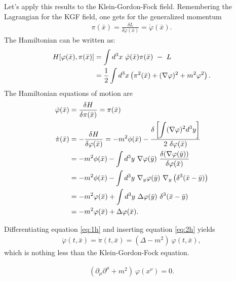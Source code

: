 Let's apply this results to the Klein-Gordon-Fock field. Remembering the Lagrangian for the KGF field, one gets for the generalized momentum
\begin{align}
\pi(\bar{x}) = \frac{\delta L}{\delta \dot{\varphi}(\bar{x})} = \dot{\varphi}(\bar{x}).
\end{align}
The Hamiltonian can be written as:
\begin{align}
H[\varphi(\bar{x}), \pi(\bar{x})] &= \int d^3 x \ \dot{\varphi}(\bar{x}) \pi(\bar{x}) \ - \ L \notag \\
&= \frac{1}{2} \int d^3 x \left( \pi^2(\bar{x}) + (\nabla \varphi)^2 + m^2 \varphi^2 \right).
\end{align}
The Hamiltonian equations of motion are
\begin{align}
\dot{\varphi}(\bar{x}) &= \frac{\delta H}{\delta \pi(\bar{x})} = \pi(\bar{x}) \label{eq:1h} \\
\dot{\pi}(\bar{x}) &= - \frac{\delta H}{\delta \varphi(\bar{x})} = - m^2 \phi(\bar{x}) - \frac{\delta \left[\displaystyle\int (\nabla \varphi)^2 d^3 y \right]}{2 \ \delta \varphi(\bar{x})} \notag \\
&= - m^2 \phi(\bar{x}) - \displaystyle\int d^3 y \ \nabla \varphi(\bar{y}) \ \frac{\delta (\nabla \varphi(\bar{y}))}{\delta \varphi(\bar{x})} \notag \\
&= - m^2 \phi(\bar{x}) - \displaystyle\int d^3 y \ \nabla_y \varphi(\bar{y}) \ \nabla_y \left( \delta^3(\bar{x}-\bar{y}) \right) \notag \\
&= - m^2 \varphi(\bar{x}) + \displaystyle\int d^3 y \ \Delta \varphi(\bar{y}) \ \delta^3(\bar{x}-\bar{y}) \notag \\
&= - m^2 \varphi(\bar{x}) + \Delta \varphi(\bar{x}). \label{eq:2h}
\end{align}

Differentiating equation \eqref{eq:1h} and inserting equation \eqref{eq:2h} yields
\begin{align}
\ddot{\varphi}(t, \bar{x}) = \dot{\pi}(t, \bar{x}) = (\Delta - m^2) \ \varphi(t, \bar{x}),
\end{align}
which is nothing less than the Klein-Gordon-Fock equation.


\begin{definition}
\begin{align}
(\partial_{\mu} \partial^{\mu} + m^2) \ \varphi(x^{\nu}) = 0. 
\end{align}
\end{definition}

